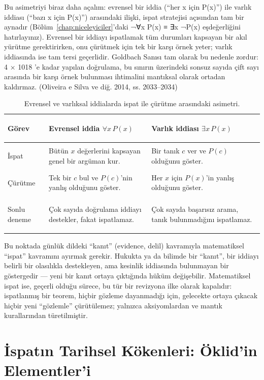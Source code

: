 Bu asimetriyi biraz daha açalım: evrensel bir iddia (“her x için P(x)”) ile varlık iddiası (“bazı x için P(x)”) arasındaki ilişki, ispat stratejisi açısından tam bir aynadır (Bölüm~\ref{chap:niceleyiciler}’daki ¬∀x P(x) ≡ ∃x ¬P(x) eşdeğerliğini hatırlayınız). Evrensel bir iddiayı ispatlamak tüm durumları kapsayan bir akıl yürütme gerektirirken, onu çürütmek için tek bir karşı örnek yeter; varlık iddiasında ise tam tersi geçerlidir. Goldbach Sanısı tam olarak bu nedenle zordur: 4 × 1018 ’e kadar yapılan doğrulama, bu sınırın üzerindeki sonsuz sayıda çift sayı arasında bir karşı örnek bulunması ihtimalini mantıksal olarak ortadan kaldırmaz. (Oliveira e Silva ve diğ. 2014, ss. 2033–2034)

\begin{table}[htbp]
\centering
\small
\renewcommand{\arraystretch}{1.2}
\begin{tabularx}{\linewidth}{>{\bfseries\raggedright\arraybackslash}p{2.0cm}Y Y}
\toprule
Görev & Evrensel iddia $\forall x\,P(x)$ & Varlık iddiası $\exists x\,P(x)$ \\
\midrule
İspat & Bütün $x$ değerlerini kapsayan genel bir argüman kur. & Bir tanık $c$ ver ve $P(c)$ olduğunu göster. \\
Çürütme & Tek bir $c$ bul ve $P(c)$'nin yanlış olduğunu göster. & Her $x$ için $P(x)$'in yanlış olduğunu göster. \\
Sonlu deneme & Çok sayıda doğrulama iddiayı destekler, fakat ispatlamaz. & Çok sayıda başarısız arama, tanık bulunmadığını ispatlamaz. \\
\bottomrule
\end{tabularx}
\caption{Evrensel ve varlıksal iddialarda ispat ile çürütme arasındaki asimetri.}
\end{table}

Bu noktada günlük dildeki “kanıt” (evidence, delil) kavramıyla matematiksel “ispat” kavramını ayırmak gerekir. Hukukta ya da bilimde bir “kanıt”, bir iddiayı belirli bir olasılıkla destekleyen, ama kesinlik iddiasında bulunmayan bir göstergedir — yeni bir kanıt ortaya çıktığında hüküm değişebilir. Matematiksel ispat ise, geçerli olduğu sürece, bu tür bir revizyona ilke olarak kapalıdır: ispatlanmış bir teorem, hiçbir gözleme dayanmadığı için, gelecekte ortaya çıkacak hiçbir yeni “gözlemle” çürütülemez; yalnızca aksiyomlardan ve mantık kurallarından türetilmiştir.

\section{İspatın Tarihsel Kökenleri: Öklid’in Elementler’i}

